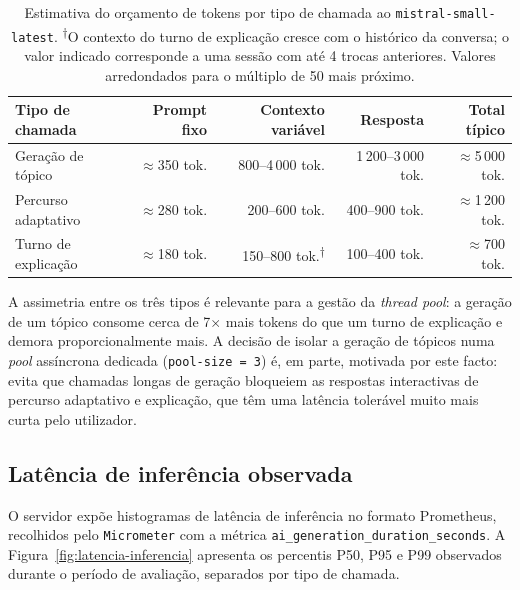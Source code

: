 \begin{table}[htbp]
    \centering
    \small
    \begin{tabular}{p{3.4cm} r r r r}
        \toprule
        \textbf{Tipo de chamada} &
        \textbf{Prompt fixo} &
        \textbf{Contexto variável} &
        \textbf{Resposta} &
        \textbf{Total típico} \\
        \midrule
        Geração de tópico
            & $\approx$350 tok.
            & 800--4\,000 tok.
            & 1\,200--3\,000 tok.
            & $\approx$5\,000 tok. \\
        Percurso adaptativo
            & $\approx$280 tok.
            & 200--600 tok.
            & 400--900 tok.
            & $\approx$1\,200 tok. \\
        Turno de explicação
            & $\approx$180 tok.
            & 150--800 tok.\textsuperscript{†}
            & 100--400 tok.
            & $\approx$700 tok. \\
        \bottomrule
    \end{tabular}
    \caption[Orçamento de tokens por tipo de chamada ao LLM]{Estimativa do orçamento de tokens por tipo de chamada ao \texttt{mistral-small-latest}. \textsuperscript{†}O contexto do turno de explicação cresce com o histórico da conversa; o valor indicado corresponde a uma sessão com até 4 trocas anteriores. Valores arredondados para o múltiplo de 50 mais próximo.}
    \label{tab:token-budget}
\end{table}

A assimetria entre os três tipos é relevante para a gestão da \emph{thread pool}: a geração de um tópico consome cerca de 7$\times$ mais tokens do que um turno de explicação e demora proporcionalmente mais. A decisão de isolar a geração de tópicos numa \emph{pool} assíncrona dedicada (\texttt{pool-size = 3}) é, em parte, motivada por este facto: evita que chamadas longas de geração bloqueiem as respostas interactivas de percurso adaptativo e explicação, que têm uma latência tolerável muito mais curta pelo utilizador.

\subsection{Latência de inferência observada}
\label{ssec:latencia-inferencia}

O servidor expõe histogramas de latência de inferência no formato Prometheus, recolhidos pelo \texttt{Micrometer} com a métrica \texttt{ai\_generation\_duration\_seconds}. A Figura~\ref{fig:latencia-inferencia} apresenta os percentis P50, P95 e P99 observados durante o período de avaliação, separados por tipo de chamada.

